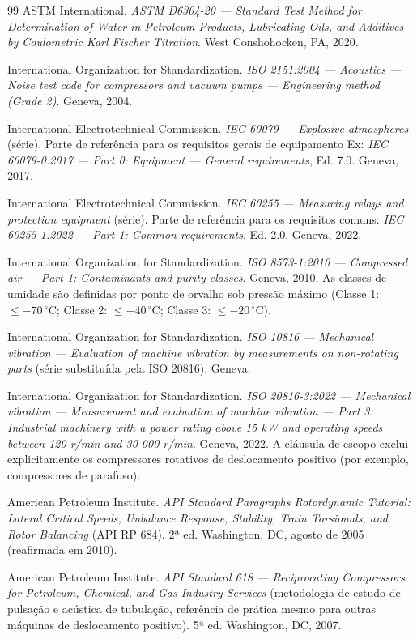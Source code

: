 \documentclass[12pt,a4paper]{article}
\numberwithin{equation}{section}
\numberwithin{table}{section}
\numberwithin{figure}{section}
\begin{document}
{\begin{thebibliography}{99}
 ASTM International. \textit{ASTM D6304-20 — Standard Test Method for Determination of Water in Petroleum Products, Lubricating Oils, and Additives by Coulometric Karl Fischer Titration}. West Conshohocken, PA, 2020.

 International Organization for Standardization. \textit{ISO 2151:2004 — Acoustics — Noise test code for compressors and vacuum pumps — Engineering method (Grade 2)}. Geneva, 2004.

 International Electrotechnical Commission. \textit{IEC 60079 — Explosive atmospheres} (série). Parte de referência para os requisitos gerais de equipamento Ex: \textit{IEC 60079-0:2017 — Part 0: Equipment — General requirements}, Ed. 7.0. Geneva, 2017.

 International Electrotechnical Commission. \textit{IEC 60255 — Measuring relays and protection equipment} (série). Parte de referência para os requisitos comuns: \textit{IEC 60255-1:2022 — Part 1: Common requirements}, Ed. 2.0. Geneva, 2022.

 International Organization for Standardization. \textit{ISO 8573-1:2010 — Compressed air — Part 1: Contaminants and purity classes}. Geneva, 2010. As classes de umidade são definidas por ponto de orvalho sob pressão máximo (Classe 1: $\le -70\,^{\circ}$C; Classe 2: $\le -40\,^{\circ}$C; Classe 3: $\le -20\,^{\circ}$C).

 International Organization for Standardization. \textit{ISO 10816 — Mechanical vibration — Evaluation of machine vibration by measurements on non-rotating parts} (série substituída pela ISO 20816). Geneva.

 International Organization for Standardization. \textit{ISO 20816-3:2022 — Mechanical vibration — Measurement and evaluation of machine vibration — Part 3: Industrial machinery with a power rating above 15 kW and operating speeds between 120 r/min and 30 000 r/min}. Geneva, 2022. A cláusula de escopo exclui explicitamente os compressores rotativos de deslocamento positivo (por exemplo, compressores de parafuso).

 American Petroleum Institute. \textit{API Standard Paragraphs Rotordynamic Tutorial: Lateral Critical Speeds, Unbalance Response, Stability, Train Torsionals, and Rotor Balancing} (API RP 684). 2ª ed. Washington, DC, agosto de 2005 (reafirmada em 2010).

 American Petroleum Institute. \textit{API Standard 618 — Reciprocating Compressors for Petroleum, Chemical, and Gas Industry Services} (metodologia de estudo de pulsação e acústica de tubulação, referência de prática mesmo para outras máquinas de deslocamento positivo). 5ª ed. Washington, DC, 2007.


\end{thebibliography}}
\end{document}
